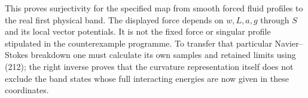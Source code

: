 This proves surjectivity for the specified map from smooth forced fluid
profiles to the real first physical band. The displayed force depends on
\(w,L,a,g\) through \(S\) and its local vector potentials. It is not the
fixed force or singular profile stipulated in the counterexample
programme. To transfer that particular Navier--Stokes breakdown one must
calculate its own samples and retained limits using (212); the right
inverse proves that the curvature representation itself does not exclude
the band states whose full interacting energies are now given in these
coordinates.

